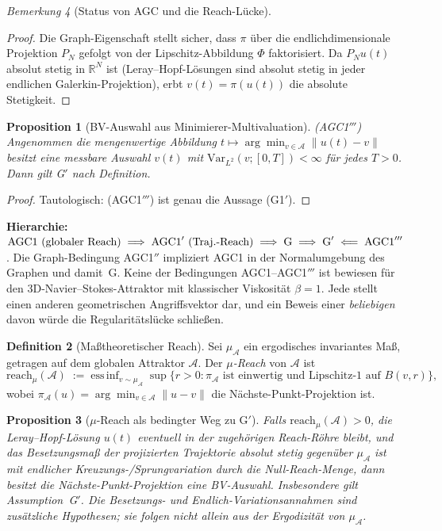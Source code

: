 \documentclass[12pt,a4paper]{article}
\theoremstyle{definition}
\newtheorem{definition}{Definition}[section]
\theoremstyle{plain}
\newtheorem{proposition}[definition]{Proposition}
\theoremstyle{remark}
\newtheorem{remark}[definition]{Bemerkung}
\begin{document}
\begin{remark}[Status von AGC und die Reach-Lücke]
\begin{proof}
Die Graph-Eigenschaft stellt sicher, dass $\pi$ über die
endlichdimensionale Projektion $P_N$ gefolgt von der Lipschitz-Abbildung
$\Phi$ faktorisiert. Da $P_N u(t)$ absolut stetig in $\mathbb{R}^N$ ist (Leray--Hopf-Lösungen sind absolut stetig in jeder endlichen Galerkin-Projektion),
erbt $v(t) = \pi(u(t))$ die absolute Stetigkeit.
\end{proof}

\begin{proposition}[BV-Auswahl aus Minimierer-Multivaluation]
\label{prop:bv-selection}
\textup{(AGC1$'''$)}\;
Angenommen die mengenwertige Abbildung $t \mapsto \arg\min_{v \in \mathcal{A}}
\|u(t)-v\|$ besitzt eine messbare Auswahl $v(t)$ mit
$\mathrm{Var}_{L^2}(v; [0,T]) < \infty$ für jedes $T > 0$.
Dann gilt G$'$ nach Definition.
\end{proposition}

\begin{proof}
Tautologisch: (AGC1$'''$) ist genau die Aussage (G1$'$).
\end{proof}

\noindent
\textbf{Hierarchie:}\;
$\textup{AGC1 (globaler Reach)}
\;\Longrightarrow\;
\textup{AGC1}' \textup{ (Traj.-Reach)}
\;\Longrightarrow\;
\textup{G}
\;\Longrightarrow\;
\textup{G}'
\;\Longleftarrow\;
\textup{AGC1}'''$.
Die Graph-Bedingung AGC1$''$ impliziert AGC1 in der Normalumgebung des Graphen
und damit~G.
Keine der Bedingungen AGC1--AGC1$'''$ ist bewiesen für den 3D-Navier--Stokes-Attraktor
mit klassischer Viskosität $\beta = 1$. Jede stellt einen anderen
geometrischen Angriffsvektor dar, und ein Beweis einer \emph{beliebigen} davon würde die
Regularitätslücke schließen.

\begin{definition}[Maßtheoretischer Reach]\label{def:mu-reach}
Sei $\mu_{\mathcal{A}}$ ein ergodisches invariantes Maß, getragen auf dem
globalen Attraktor $\mathcal{A}$.
Der \emph{$\mu$-Reach} von $\mathcal{A}$ ist
\[
  \mathrm{reach}_\mu(\mathcal{A})
  \;:=\; \mathrm{ess\,inf}_{v \sim \mu_{\mathcal{A}}}\;
  \sup\!\bigl\{r > 0 : \pi_{\mathcal{A}}
  \text{ ist einwertig und Lipschitz-1 auf } B(v,r)\bigr\},
\]
wobei $\pi_{\mathcal{A}}(u) = \arg\min_{v \in \mathcal{A}}\|u - v\|$ die
Nächste-Punkt-Projektion ist.
\end{definition}

\begin{proposition}[$\mu$-Reach als bedingter Weg zu G$'$]\label{prop:mu-reach}
Falls $\mathrm{reach}_\mu(\mathcal{A}) > 0$, die Leray--Hopf-Lösung $u(t)$
eventuell in der zugehörigen Reach-Röhre bleibt, und das
Besetzungsmaß der projizierten Trajektorie absolut stetig gegenüber
$\mu_{\mathcal{A}}$ ist mit endlicher Kreuzungs-/Sprungvariation durch
die Null-Reach-Menge, dann besitzt die Nächste-Punkt-Projektion eine
BV-Auswahl. Insbesondere gilt Assumption~G$'$. Die Besetzungs- und
Endlich-Variationsannahmen sind zusätzliche Hypothesen; sie folgen
nicht allein aus der Ergodizität von $\mu_{\mathcal{A}}$.
\end{proposition}


\end{remark}
\end{document}
